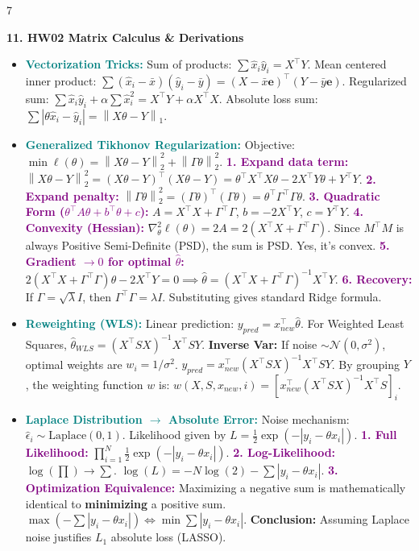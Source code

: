 \documentclass{article}
\newcommand{\norm}[1]{\left\lVert#1\right\rVert}
\newcommand{\hlhighlight}[1]{\par\vspace{1.5pt}\noindent\colorbox{yellow!50}{\parbox{\dimexpr\columnwidth-2\fboxsep\relax}{\textbf{#1}}}\par\vspace{0.5pt}}
\newcommand{\sectitle}[1]{\par\textbf{\color{blue!70!black}{#1}}\par}
\newcommand{\concept}[1]{\textcolor{teal}{\textbf{#1}}}
\newcommand{\procname}[1]{\textcolor{purple}{\textbf{#1}}}
\newcommand{\lbl}[1]{\textcolor{green!60!black}{\textbf{#1}}}
\newcommand{\lblnb}[1]{\textcolor{green!60!black}{#1}}
\begin{document}
\begin{multicols}{7}
\hlhighlight{11. HW02 Matrix Calculus \& Derivations}
\sectitle{Advanced Mechanics}
\begin{itemize}
    \item \concept{Vectorization Tricks:} \lblnb{Sum of products:} $\sum \hat{x}_i \hat{y}_i = X^\top Y$. \lblnb{Mean centered inner product:} $\sum(\hat{x}_i - \bar{x})(\hat{y}_i - \bar{y}) = (X - \bar{x}\mathbf{e})^\top (Y - \bar{y}\mathbf{e})$. \lblnb{Regularized sum:} $\sum \hat{x}_i \hat{y}_i + \alpha \sum \hat{x}_i^2 = X^\top Y + \alpha X^\top X$. \lblnb{Absolute loss sum:} $\sum | \theta \hat{x}_i - \hat{y}_i | = \norm{X\theta - Y}_1$.
    \item \concept{Generalized Tikhonov Regularization:} Objective: $\min \ell(\theta) = \norm{X\theta - Y}_2^2 + \norm{\Gamma\theta}_2^2$. \procname{1. Expand data term:} $\norm{X\theta - Y}_2^2 = (X\theta - Y)^\top (X\theta - Y) = \theta^\top X^\top X \theta - 2X^\top Y \theta + Y^\top Y$. \procname{2. Expand penalty:} $\norm{\Gamma\theta}_2^2 = (\Gamma\theta)^\top(\Gamma\theta) = \theta^\top \Gamma^\top \Gamma \theta$. \procname{3. Quadratic Form ($\theta^\top A \theta + b^\top \theta + c$):} $A = X^\top X + \Gamma^\top \Gamma$, $b = -2X^\top Y$, $c = Y^\top Y$. \procname{4. Convexity (Hessian):} $\nabla^2_\theta \ell(\theta) = 2A = 2(X^\top X + \Gamma^\top \Gamma)$. Since $M^\top M$ is always Positive Semi-Definite (PSD), the sum is PSD. Yes, it's convex. \procname{5. Gradient $\to 0$ for optimal $\hat{\theta}$:} $2(X^\top X + \Gamma^\top \Gamma)\theta - 2X^\top Y = 0 \implies \hat{\theta} = (X^\top X + \Gamma^\top \Gamma)^{-1}X^\top Y$. \procname{6. Recovery:} If $\Gamma = \sqrt{\lambda}I$, then $\Gamma^\top \Gamma = \lambda I$. Substituting gives standard Ridge formula.
    \item \concept{Reweighting (WLS):} Linear prediction: $y_{pred} = x_{new}^\top \hat{\theta}$. For Weighted Least Squares, $\hat{\theta}_{WLS} = (X^\top S X)^{-1}X^\top S Y$. \lbl{Inverse Var:} If noise $\sim \mathcal{N}(0, \sigma^2)$, optimal weights are $w_i = 1/\sigma^2$. $y_{pred} = x_{new}^\top (X^\top S X)^{-1}X^\top S Y$. By grouping $Y$, the weighting function $w$ is: $w(X, S, x_{new}, i) = [x_{new}^\top(X^\top S X)^{-1}X^\top S]_i$.
    \item \concept{Laplace Distribution $\to$ Absolute Error:} Noise mechanism: $\hat{\epsilon}_i \sim \text{Laplace}(0,1)$. Likelihood given by $L = \frac{1}{2}\exp(-|y_i - \theta x_i|)$. \procname{1. Full Likelihood:} $\prod_{i=1}^N \frac{1}{2}\exp(-|y_i - \theta x_i|)$. \procname{2. Log-Likelihood:} $\log(\prod) \to \sum$. $\log(L) = -N\log(2) - \sum |y_i - \theta x_i|$. \procname{3. Optimization Equivalence:} Maximizing a negative sum is mathematically identical to \lbl{minimizing} a positive sum. $\max (-\sum |y_i - \theta x_i|) \iff \min \sum |y_i - \theta x_i|$. \lbl{Conclusion:} Assuming Laplace noise justifies $L_1$ absolute loss (LASSO).

\end{itemize}
\end{multicols}
\end{document}
